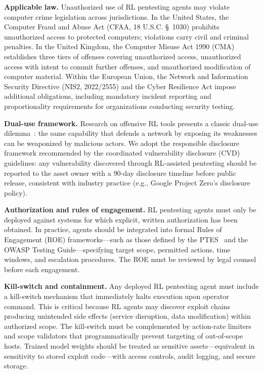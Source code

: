 \documentclass[conference]{IEEEtran}
\begin{document}
\textbf{Applicable law.}  Unauthorized use of RL pentesting agents
may violate computer crime legislation across jurisdictions.  In the
United States, the Computer Fraud and Abuse Act (CFAA, 18 U.S.C.
\S~1030) prohibits unauthorized access to protected computers; violations
carry civil and criminal penalties.  In the United Kingdom, the Computer
Misuse Act 1990 (CMA) establishes three tiers of offenses covering
unauthorized access, unauthorized access with intent to commit further
offenses, and unauthorized modification of computer material.  Within
the European Union, the Network and Information Security Directive
(NIS2, 2022/2555) and the Cyber Resilience Act impose additional
obligations, including mandatory incident reporting and proportionality
requirements for organizations conducting security testing.

\textbf{Dual-use framework.}  Research on offensive RL tools presents
a classic dual-use dilemma~\cite{kennedy2011metasploit}: the same
capability that defends a network by exposing its weaknesses can be
weaponized by malicious actors.  We adopt the responsible disclosure
framework recommended by the coordinated vulnerability disclosure
(CVD) guidelines: any vulnerability discovered through RL-assisted
pentesting should be reported to the asset owner with a 90-day
disclosure timeline before public release, consistent with industry
practice (e.g., Google Project Zero's disclosure policy).

\textbf{Authorization and rules of engagement.}  RL pentesting agents
must only be deployed against systems for which explicit, written
authorization has been obtained.  In practice, agents should be
integrated into formal Rules of Engagement (ROE) frameworks---such as
those defined by the PTES~\cite{ptes2014standard} and the OWASP Testing
Guide---specifying target scope, permitted actions, time windows, and
escalation procedures.  The ROE must be reviewed by legal counsel
before each engagement.

\textbf{Kill-switch and containment.}  Any deployed RL pentesting
agent must include a kill-switch mechanism that immediately halts
execution upon operator command.  This is critical because RL agents
may discover exploit chains producing unintended side effects
(service disruption, data modification) within authorized scope.
The kill-switch must be complemented by action-rate limiters and
scope validators that programmatically prevent targeting of
out-of-scope hosts.  Trained model weights should be treated as
sensitive assets---equivalent in sensitivity to stored exploit
code---with access controls, audit logging, and secure storage.
\end{document}
